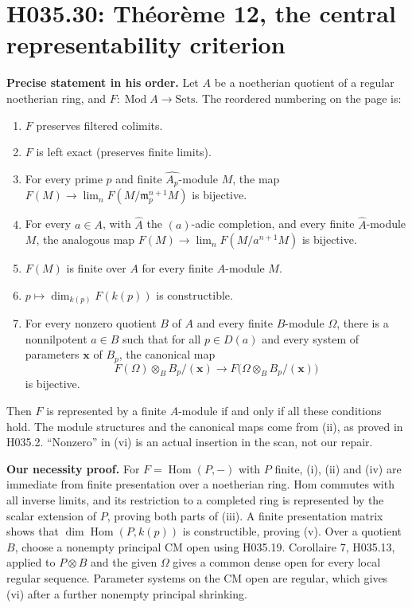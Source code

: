 \section{H035.30: Théorème 12, the central representability criterion}
\textbf{Precise statement in his order.} Let $A$ be a noetherian
quotient of a regular noetherian ring, and $F:\operatorname{Mod}A\to
\mathrm{Sets}$. The reordered numbering on the page is:
\begin{enumerate}
\item[(i)] $F$ preserves filtered colimits.
\item[(ii)] $F$ is left exact (preserves finite limits).
\item[(iii a)] For every prime $p$ and finite $\widehat{A_p}$-module
$M$, the map $F(M)\to\lim_nF(M/\mathfrak m_p^{n+1}M)$ is bijective.
\item[(iii b)] For every $a\in A$, with $\widehat A$ the $(a)$-adic
completion, and every finite $\widehat A$-module $M$, the analogous
map $F(M)\to\lim_nF(M/a^{n+1}M)$ is bijective.
\item[(iv)] $F(M)$ is finite over $A$ for every finite $A$-module $M$.
\item[(v)] $p\mapsto\dim_{k(p)}F(k(p))$ is constructible.
\item[(vi)] For every nonzero quotient $B$ of $A$ and every finite
$B$-module $\Omega$, there is a nonnilpotent $a\in B$ such that
for all $p\in D(a)$ and every system of parameters $\mathbf x$ of
$B_p$, the canonical map
\[
 F(\Omega)\otimes_B B_p/(\mathbf x)
 \longrightarrow F\bigl(\Omega\otimes_B B_p/(\mathbf x)\bigr)
\]
is bijective.
\end{enumerate}
Then $F$ is represented by a finite $A$-module if and only if all
these conditions hold. The module structures and the canonical maps
come from (ii), as proved in H035.2. ``Nonzero'' in (vi) is an actual
insertion in the scan, not our repair.

\textbf{Our necessity proof.} For $F=\operatorname{Hom}(P,-)$ with
$P$ finite, (i), (ii) and (iv) are immediate from finite presentation
over a noetherian ring. Hom commutes with all inverse limits, and its
restriction to a completed ring is represented by the scalar extension
of $P$, proving both parts of (iii). A finite presentation matrix
shows that $\dim\operatorname{Hom}(P,k(p))$ is constructible, proving
(v). Over a quotient $B$, choose a nonempty principal CM open using
H035.19. Corollaire 7, H035.13, applied to $P\otimes B$ and the
given $\Omega$ gives a common dense open for every local regular
sequence. Parameter systems on the CM open are regular, which gives
(vi) after a further nonempty principal shrinking.

